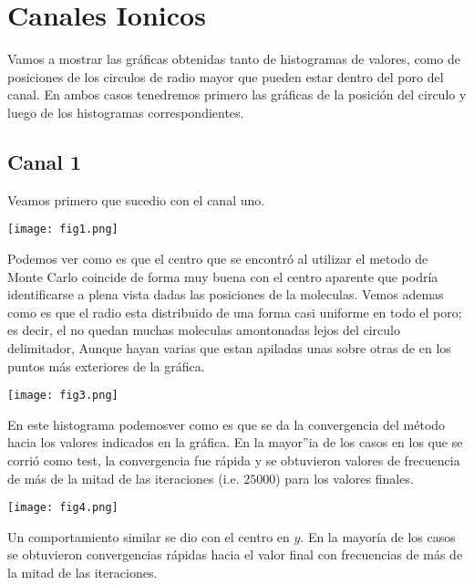 \documentclass[]{article}
\begin{document}
\section{Canales Ionicos}
Vamos a mostrar las gr\'aficas obtenidas tanto de histogramas de valores, como de posiciones de los circulos de radio mayor que pueden estar dentro del poro del canal. En ambos casos tenedremos primero las gr\'aficas de la posici\'on del circulo y luego de los histogramas correspondientes.\\
\subsection{Canal 1}
Veamos primero que sucedio con el canal uno.
\begin{center}
  \texttt{[image: fig1.png]}
\end{center}
Podemos ver como es que el centro que se encontr\'o al utilizar el metodo de Monte Carlo coincide de forma muy buena con el centro aparente que podr\'ia identificarse a plena vista dadas las posiciones de la moleculas. Vemos ademas como es que el radio esta distribuido de una forma casi uniforme en todo el poro; es decir, el no quedan muchas moleculas amontonadas lejos del circulo delimitador, Aunque hayan varias que estan apiladas unas sobre otras de en los puntos m\'as exteriores de la gr\'afica.
\begin{center}
  \texttt{[image: fig3.png]}
\end{center}
En este histograma podemosver como es que se da la convergencia del m\'etodo hacia los valores indicados en la gr\'afica. En la mayor''ia de los casos en los que se corri\'o como test, la convergencia fue r\'apida y se obtuvieron valores de frecuencia de m\'as de la mitad de las iteraciones (i.e. $25000$) para los valores finales.
\begin{center}
  \texttt{[image: fig4.png]}
\end{center}
Un comportamiento similar se dio con el centro en $y$. En la mayor\'ia de los casos se obtuvieron convergencias r\'apidas hacia el valor final con frecuencias de m\'as de la mitad de las iteraciones.
\end{document}
